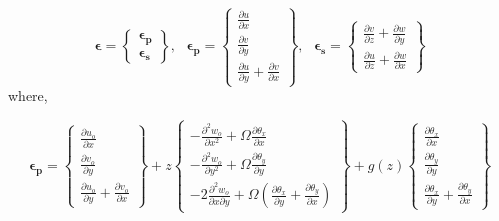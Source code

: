 \documentclass[3p,preprint,12pt]{elsarticle}
\begin{document}
\begin{equation}\label{eq:Strains1}
\boldsymbol{\epsilon}  = 
\left\{
\begin{array}{c}
\boldsymbol{\epsilon_{p}} \\
\boldsymbol{\epsilon_{s}}
\end{array}	
\right\} ,\,\,\,\,
\boldsymbol{\epsilon_{p}}=\left\{ \begin{array}{c}
\frac{\partial u}{\partial x}\\
\frac{\partial v}{\partial y}\\
\frac{\partial u}{\partial y}+\frac{\partial v}{\partial x}
\end{array}\right\} ,\,\,\,\,
\boldsymbol{\epsilon_{s}}=\left\{ \begin{array}{c}
\frac{\partial v}{\partial z}+\frac{\partial w}{\partial y}\\
\frac{\partial u}{\partial z}+\frac{\partial w}{\partial x}
\end{array}\right\}
\end{equation}
where,

\begin{equation}\label{eq:Strains2}
\boldsymbol{\epsilon_{p}}=
\left\{ \begin{array}{c}
\frac{\partial u_{o}}{\partial x}\\
\frac{\partial v_{o}}{\partial y}\\
\frac{\partial u_{o}}{\partial y}+\frac{\partial v_{o}}{\partial x}
\end{array}\right\} +z\left\{ \begin{array}{c}
-\frac{\partial^{2}w_{o}}{\partial x^{2}}+\Omega\frac{\partial\theta_{x}}{\partial x}\\
-\frac{\partial^{2}w_{o}}{\partial y^{2}}+\Omega\frac{\partial\theta_{y}}{\partial y}\\
-2\frac{\partial^{2}w_{o}}{\partial x\partial y}+\Omega\left(\frac{\partial\theta_{x}}{\partial y}+\frac{\partial\theta_{y}}{\partial x}\right)
\end{array}\right\} +g(z)\left\{ \begin{array}{c}
\frac{\partial\theta_{x}}{\partial x}\\
\frac{\partial\theta_{y}}{\partial y}\\
\frac{\partial\theta_{x}}{\partial y}+\frac{\partial\theta_{y}}{\partial x}
\end{array}\right\} 
\end{equation}
\end{document}
